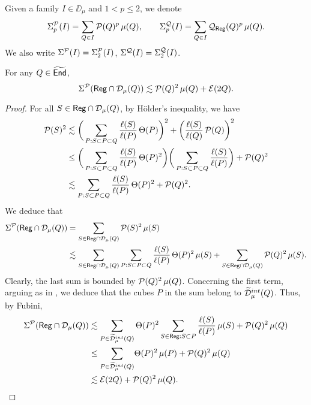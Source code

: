 Given a family $I\in\DD_\mu$ and $1<p\leq2$, we denote
$$\Sigma_p^{\mathcal P}(I) = \sum_{Q\in I} {\mathcal P}(Q)^p\,\mu(Q),\qquad \Sigma_p^{\mathcal Q}(I) = \sum_{Q\in I} {\mathcal Q}_{\mathsf{Reg}}(Q)^p\,\mu(Q).$$
We also write $\Sigma^{\mathcal P}(I)= \Sigma_2^{\mathcal P}(I)$, $\Sigma^{\mathcal Q}(I)= \Sigma_2^{\mathcal Q}(I)$.

\vv

\begin{lemma}\label{lemenereg}
For any $Q\in{\widetilde{{\mathsf{End}}}}$, 
$$\Sigma^{\mathcal P}({\mathsf{Reg}}\cap{\mathcal D}_\mu(Q)) \lesssim {\mathcal P}(Q)^2\,\mu(Q) + {\mathcal E}(2Q).$$
\end{lemma}

\begin{proof}
 For all $S\in{\mathsf{Reg}}\cap {\mathcal D}_\mu(Q)$, by H\"older's inequality, we have
\begin{align*}
{\mathcal P}(S)^2 &\lesssim \bigg(\sum_{P:S\subset P\subset Q}\frac{\ell(S)}{\ell(P)}\,\Theta(P)\bigg)^2
+ \bigg(\frac{\ell(S)}{\ell(Q)}\,{\mathcal P}(Q)\bigg)^2\\
& \leq \bigg(\sum_{P:S\subset P\subset Q}\frac{\ell(S)}{\ell(P)}\,\Theta(P)^2\bigg)
\bigg(\sum_{P:S\subset P\subset Q}\frac{\ell(S)}{\ell(P)}\bigg) +
{\mathcal P}(Q)^2\\
& \lesssim \sum_{P:S\subset P\subset Q}\frac{\ell(S)}{\ell(P)}\,\Theta(P)^2+ 
{\mathcal P}(Q)^2.
\end{align*}
We deduce that
\begin{align*}
\Sigma^{\mathcal P}({\mathsf{Reg}}\cap{\mathcal D}_\mu(Q)) &=
\sum_{S\in{\mathsf{Reg}}\cap {\mathcal D}_\mu(Q)} {\mathcal P}(S)^2\,\mu(S)\\
& \lesssim
\sum_{S\in{\mathsf{Reg}}\cap {\mathcal D}_\mu(Q)} 
\sum_{P:S\subset P\subset Q}\frac{\ell(S)}{\ell(P)}\,\Theta(P)^2\,\mu(S) +
\sum_{S\in{\mathsf{Reg}}\cap {\mathcal D}_\mu(Q)} {\mathcal P}(Q)^2\,\mu(S).
\end{align*}
Clearly, the last sum is bounded by ${\mathcal P}(Q)^2\,\mu(Q)$. Concerning the first term,
arguing as in , we deduce that the cubes $P$ in the sum belong to 
${\widetilde{{\mathcal D}}}_\mu^{int}(Q)$. Thus, by Fubini,
\begin{align*}
\Sigma^{\mathcal P}({\mathsf{Reg}}\cap{\mathcal D}_\mu(Q)) &\lesssim 
\sum_{P\in{\widetilde{{\mathcal D}}}_\mu^{int}(Q)} \Theta(P)^2 \sum_{S\in{\mathsf{Reg}}:S\subset P}\frac{\ell(S)}{\ell(P)}\,\mu(S)
+ {\mathcal P}(Q)^2\,\mu(Q)\\
& \leq \sum_{P\in{\widetilde{{\mathcal D}}}_\mu^{int}(Q)}\! \Theta(P)^2 \,\mu(P) + {\mathcal P}(Q)^2\,\mu(Q)\\ 
&\lesssim {\mathcal E}(2Q)
+ {\mathcal P}(Q)^2\,\mu(Q).
\end{align*}
\end{proof}


